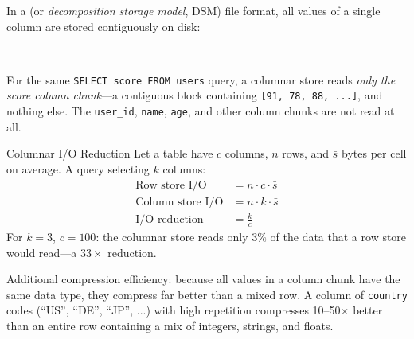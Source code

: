 In a  (or \emph{decomposition storage model}, DSM) file
format, all values of a single column are stored contiguously on disk:

\begin{center}
\setlength{\fboxsep}{4pt}
 $\;\;\;$
 $\;\;\;$
\end{center}

For the same \texttt{SELECT score FROM users} query, a columnar store
reads \emph{only the score column chunk}---a contiguous block containing
\texttt{[91, 78, 88, ...]}, and nothing else. The \texttt{user\_id},
\texttt{name}, \texttt{age}, and other column chunks are not read at all.

\begin{defbox}{Columnar I/O Reduction}
Let a table have $c$ columns, $n$ rows, and $\bar{s}$ bytes per cell on
average. A query selecting $k$ columns:
\begin{align}
\text{Row store I/O}     &= n \cdot c \cdot \bar{s} \label{eq:row-io} \\
\text{Column store I/O}  &= n \cdot k \cdot \bar{s} \label{eq:col-io} \\
\text{I/O reduction}     &= \frac{k}{c} \label{eq:io-reduction}
\end{align}
For $k = 3$, $c = 100$: the columnar store reads only $3\%$ of the
data that a row store would read---a $33\times$ reduction.
\end{defbox}

Additional compression efficiency: because all values in a column chunk
have the same data type, they compress far better than a mixed row.
A column of \texttt{country} codes (``US'', ``DE'', ``JP'', ...) with
high repetition compresses 10--50$\times$ better than an entire row
containing a mix of integers, strings, and floats.

